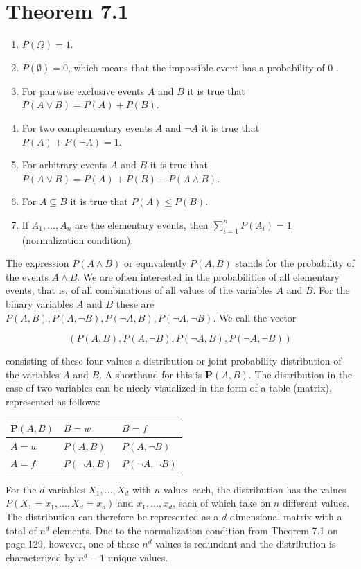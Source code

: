\documentclass[10pt]{book}
\begin{document}
\section*{Theorem 7.1}
\begin{enumerate}
  \item $P(\Omega)=1$.
  \item $P(\emptyset)=0$, which means that the impossible event has a probability of 0 .
  \item For pairwise exclusive events $A$ and $B$ it is true that $P(A \vee B)=P(A)+P(B)$.
  \item For two complementary events $A$ and $\neg A$ it is true that $P(A)+P(\neg A)=1$.
  \item For arbitrary events $A$ and $B$ it is true that $P(A \vee B)=P(A)+P(B)- P(A \wedge B)$.
  \item For $A \subseteq B$ it is true that $P(A) \leq P(B)$.
  \item If $A_{1}, \ldots, A_{n}$ are the elementary events, then $\sum_{i=1}^{n} P\left(A_{i}\right)=1$ (normalization condition).
\end{enumerate}

The expression $P(A \wedge B)$ or equivalently $P(A, B)$ stands for the probability of the events $A \wedge B$. We are often interested in the probabilities of all elementary events, that is, of all combinations of all values of the variables $A$ and $B$. For the binary variables $A$ and $B$ these are $P(A, B), P(A, \neg B), P(\neg A, B), P(\neg A, \neg B)$. We call the vector

$$
(P(A, B), P(A, \neg B), P(\neg A, B), P(\neg A, \neg B))
$$

consisting of these four values a distribution or joint probability distribution of the variables $A$ and $B$. A shorthand for this is $\boldsymbol{P}(A, B)$. The distribution in the case of two variables can be nicely visualized in the form of a table (matrix), represented as follows:

\begin{center}
\begin{tabular}{lll}
$\boldsymbol{P}(A, B)$ & $B=w$ & $B=f$ \\
\hline
$A=w$ & $P(A, B)$ & $P(A, \neg B)$ \\
\hline
$A=f$ & $P(\neg A, B)$ & $P(\neg A, \neg B)$ \\
\hline
\end{tabular}
\end{center}

For the $d$ variables $X_{1}, \ldots, X_{d}$ with $n$ values each, the distribution has the values $P\left(X_{1}=x_{1}, \ldots, X_{d}=x_{d}\right)$ and $x_{1}, \ldots, x_{d}$, each of which take on $n$ different values. The distribution can therefore be represented as a $d$-dimensional matrix with a total of $n^{d}$ elements. Due to the normalization condition from Theorem 7.1 on page 129, however, one of these $n^{d}$ values is redundant and the distribution is characterized by $n^{d}-1$ unique values.
\end{document}
